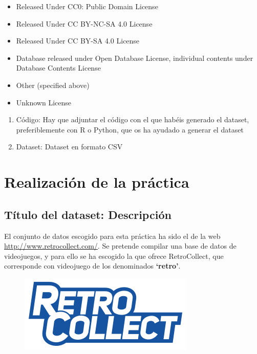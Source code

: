 \documentclass[]{article}
\providecommand{\tightlist}{%
  \setlength{\itemsep}{0pt}\setlength{\parskip}{0pt}}
\begin{document}
\begin{itemize}
\tightlist
\item
  Released Under CC0: Public Domain License
\item
  Released Under CC BY-NC-SA 4.0 License
\item
  Released Under CC BY-SA 4.0 License
\item
  Database released under Open Database License, individual contents
  under Database Contents License
\item
  Other (specified above)
\item
  Unknown License
\end{itemize}

\begin{enumerate}
\def\labelenumi{\arabic{enumi}.}
\setcounter{enumi}{8}
\tightlist
\item
  Código: Hay que adjuntar el código con el que habéis generado el
  dataset, preferiblemente con R o Python, que os ha ayudado a generar
  el dataset
\item
  Dataset: Dataset en formato CSV
\end{enumerate}

\clearpage

\section{Realización de la práctica}\label{realizacion-de-la-practica}

\subsection{Título del dataset:
Descripción}\label{titulo-del-dataset-descripcion}

El conjunto de datos escogido para esta práctica ha sido el de la web
\url{http://www.retrocollect.com/}. Se pretende compilar una base de
datos de videojuegos, y para ello se ha escogido la que ofrece
RetroCollect, que corresponde con videojuego de los denominados
\textbf{`retro'}.

\begin{figure}[h!]
\centering
\includegraphics{RetroCollect-Logo.png}
\end{figure}
\end{document}
